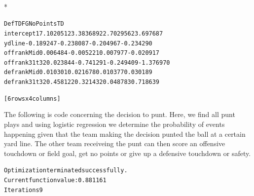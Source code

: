 \documentclass[letterpaper,10pt,english]{/anaconda/lib/python2.7/site-packages/sphinx/texinputs/sphinxhowto}
\def\smaller{\fontsize{9.5pt}{9.5pt}\selectfont}
\newenvironment{InvisibleVerbatim}
        {\begin{mdframed}[leftmargin=0.1\linewidth,innerleftmargin=3pt,innerrightmargin=3pt, userdefinedwidth=1\linewidth, linewidth=0pt, linecolor=white, usetwoside=false]}
        {\end{mdframed}}
\begin{document}
                \makebox[0.1\linewidth]{\smaller\hfill\tt\color{nbframe-out-prompt}Out\hspace{4pt}{[}13{]}:\hspace{4pt}}\\*
                \vspace{-2.55\baselineskip}\begin{InvisibleVerbatim}
                \vspace{-0.5\baselineskip}
\begin{alltt}                  DefTD         FG   NoPoints         TD
intercept     17.102051  23.383689  22.702956  23.697687
ydline        -0.189247  -0.238087  -0.204967  -0.234290
offrankMid     0.006484  -0.005221   0.007977  -0.020917
offrank31t32   0.023844  -0.741291  -0.249409  -1.376970
defrankMid     0.010301   0.021678   0.010377   0.030189
defrank31t32   0.458122   0.321432   0.048783   0.718639

[6 rows x 4 columns]\end{alltt}

            \end{InvisibleVerbatim}
            
        
    
The following is code concerning the decision to punt. Here, we find all
punt plays and using logistic regression we determine the probability of
events happening given that the team making the decision punted the ball
at a certain yard line. The other team receiveing the punt can then
score an offensive touchdown or field goal, get no points or give up a
defensive touchdown or safety.

    

        
        

            
                \begin{InvisibleVerbatim}
                \vspace{-0.5\baselineskip}
\begin{alltt}Optimization terminated successfully.
         Current function value: 0.881161
         Iterations 9
\end{alltt}

            \end{InvisibleVerbatim}
            
\end{document}
